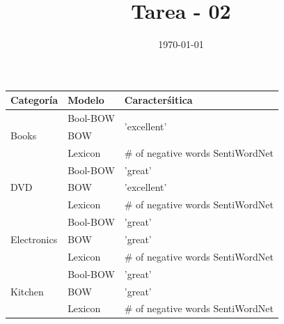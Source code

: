 \documentclass[12pt]{article}
\title{Tarea - 02}
\date{\today}
\begin{document}
    \pagestyle{fancy}
    \fancyhf{}

    \renewcommand{\headrulewidth}{0.7pt}
\fancyfoot[R]{\thepage}

\begin{titlepage}
	\centering%
\begin{table}[]
\begin{tabular}{|l|l|l|}
\hline
\textbf{Categoría}           & \textbf{Modelo} & \textbf{Caracterśitica}            \\ \hline
\multirow{3}{*}{Books}       & Bool-BOW        & \multirow{2}{*}{'excellent'}       \\ \cline{2-2}
                             & BOW             &                                    \\ \cline{2-3} 
                             & Lexicon         & \# of negative words  SentiWordNet \\ \hline
\multirow{3}{*}{DVD}         & Bool-BOW        & 'great'                            \\ \cline{2-3} 
                             & BOW             & 'excellent'                        \\ \cline{2-3} 
                             & Lexicon         & \# of negative words  SentiWordNet \\ \hline
\multirow{3}{*}{Electronics} & Bool-BOW        & 'great'                            \\ \cline{2-3} 
                             & BOW             & 'great'                            \\ \cline{2-3} 
                             & Lexicon         & \# of negative words  SentiWordNet \\ \hline
\multirow{3}{*}{Kitchen}     & Bool-BOW        & 'great'                            \\ \cline{2-3} 
                             & BOW             & 'great'                            \\ \cline{2-3} 
                             & Lexicon         & \# of negative words  SentiWordNet \\ \hline

\end{tabular}
\end{table}
\end{titlepage}
\end{document}
